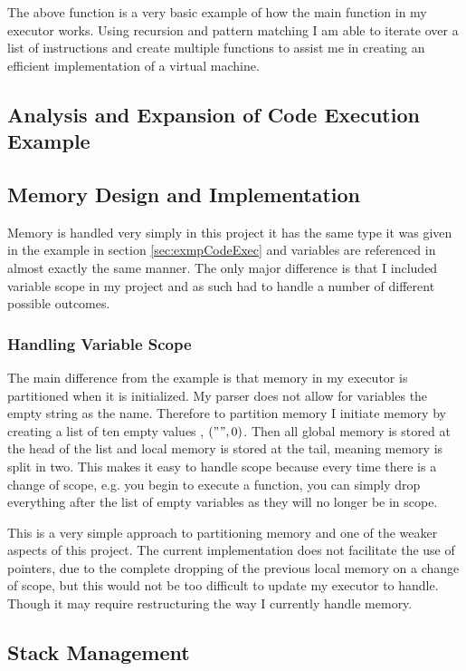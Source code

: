 The above function is a very basic example of how the main function in my executor works. Using recursion and pattern matching I am able to iterate over a list of instructions and create multiple functions to assist me in creating an efficient implementation of a virtual machine.  

\subsection{Analysis and Expansion of Code Execution Example}

\subsection{Memory Design and Implementation}

Memory is handled very simply in this project it has the same type it was given in the example in section \ref{sec:exmpCodeExec} and variables are referenced in almost exactly the same manner. The only major difference is that I included variable scope in my project and as such had to handle a number of different possible outcomes.

     

\subsubsection{Handling Variable Scope}

The main difference from the example is that memory in my executor is partitioned when it is initialized. My parser does not allow for variables the empty string as the name. Therefore to partition memory I initiate memory by creating a list of ten empty values , $("",0)$. Then all global memory is stored at the head of the list and local memory is stored at the tail, meaning memory is split in two. This makes it easy to handle scope because every time there is a change of scope, e.g. you begin to execute a function, you can simply drop everything after the list of empty variables as they will no longer be in scope.
  
This is a very simple approach to partitioning memory and one of the weaker aspects of this project. The current implementation does not facilitate the use of pointers, due to the complete dropping of the previous local memory  on a change of scope, but this would not be too difficult to update my executor to handle. Though it may require restructuring the way I currently handle memory.  


\subsection{Stack Management}

